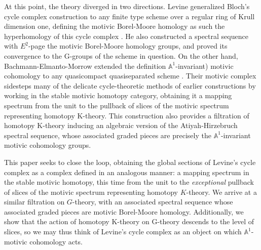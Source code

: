 \documentclass[11pt, twoside]{article}
\numberwithin{equation}{section}
\theoremstyle{definition}
\newcommand{\bb}[1]{\mathbb{#1}}
\newcommand{\G}{\mathrm{G}}
\newcommand{\K}{\mathrm{K}}
\begin{document}
At this point, the theory diverged in two directions. Levine generalized Bloch's cycle complex construction to any finite type scheme over a regular ring of Krull dimension one, defining the motivic Borel-Moore homology as such the hyperhomology of this cycle complex \cite{LevTechLoc}. He also constructed a spectral sequence with \(E^2\)-page the motivic Borel-Moore homology groups, and proved its convergence to the \(\G\)-groups of the scheme in question. On the other hand, Bachmann-Elmanto-Morrow extended the definition \(\bb{A}^1\)-invariant) motivic cohomology to any quasicompact quasiseparated scheme \cite{BEM}. Their motivic complex sidesteps many of the delicate cycle-theoretic methods of earlier constructions by working in the stable motivic homotopy category, obtaining it a mapping spectrum from the unit to the pullback of slices of the motivic spectrum representing homotopy \(\K\)-theory. This construction also provides a filtration of homotopy \(\K\)-theory inducing an algebraic version of the Atiyah-Hirzebruch spectral sequence, whose associated graded pieces are precisely the \(\bb{A}^1\)-invariant motivic cohomology groups.

This paper seeks to close the loop, obtaining the global sections of Levine's cycle complex as a complex defined in an analogous manner: a mapping spectrum in the stable motivic homotopy, this time from the unit to the \textit{exceptional} pullback of slices of the motivic spectrum representing homotopy \(K\)-theory. We arrive at a similar filtration on \(G\)-theory, with an associated spectral sequence whose associated graded pieces are motivic Borel-Moore homology. Additionally, we show that the action of homotopy \(\K\)-theory on \(\G\)-theory descends to the level of slices, so we may thus think of Levine's cycle complex as an object on which \(\bb{A}^1\)-motivic cohomology acts.
\end{document}
